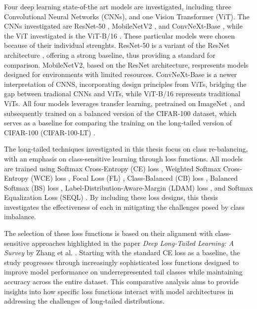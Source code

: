 Four deep learning state-of-the art models are investigated, including three Convolutional Neural Networks (CNNs), and one Vision Transformer (ViT). The CNNs investigated are ResNet-50 \cite{he2015deepresiduallearningimage}, MobileNetV2 \cite{sandler2018mobilenetv2}, and ConvNeXt-Base \cite{liu2022convnet2020s}, while the ViT investigated is the ViT-B/16 \cite{dosovitskiy2021imageworth16x16words}. These particular models were chosen because of their individual strenghts.  ResNet-50 is a variant of the ResNet architecture \cite{he2015deepresiduallearningimage}, offering a strong baseline, thus providing a standard for comparison. MobileNetV2, based on the ResNet architecture, respresents models designed for environments with limited resources. ConvNeXt-Base is a newer interpretation of CNNS, incorporating design principles from ViTs, bridging the gap between tradional CNNs and ViTs, while ViT-B/16 represents traditional ViTs. All four models leverages transfer learning, pretrained on ImageNet \cite{ImageNet2009}, and subsequently trained on a balanced version of the CIFAR-100 \cite{krizhevsky2009learning} dataset, which serves as a baseline for comparing the training on the long-tailed version of CIFAR-100 (CIFAR-100-LT) \cite{cao2019learningimbalanceddatasetslabeldistributionaware}.  

The long-tailed techniques investigated in this thesis focus on class re-balancing, with an emphasis on class-sensitive learning through loss functions. All models are trained using Softmax Cross-Entropy (CE) loss \cite{cs231n}, Weighted Softmax Cross-Entropy (WCE) loss \cite{zhang2023deep}, Focal Loss (FL) \cite{lin2018focallossdenseobject}, Class-Balanced (CB) loss \cite{cui2019classbalancedlossbasedeffective}, Balanced Softmax (BS) loss \cite{ren2020balancedmetasoftmaxlongtailedvisual}, Label-Distribution-Aware-Margin (LDAM) loss \cite{cao2019learningimbalanceddatasetslabeldistributionaware}, and Softmax Equalization Loss (SEQL) \cite{tan2020equalizationlosslongtailedobject}. By including these loss designs, this thesis investigates the effectiveness of each in mitigating the challenges posed by class imbalance.

The selection of these loss functions is based on their alignment with class-sensitive approaches highlighted in the paper \emph{Deep Long-Tailed Learning: A Survey} by Zhang et al. \cite{zhang2023deep}. Starting with the standard CE loss as a baseline, the study progresses through increasingly sophisticated loss functions designed to improve model performance on underrepresented tail classes while maintaining accuracy across the entire dataset. This comparative analysis aims to provide insights into how specific loss functions interact with model architectures in addressing the challenges of long-tailed distributions. 

